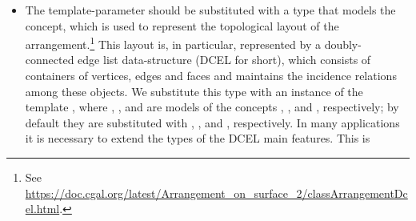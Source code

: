 \begin{itemize}
  The \cmake{} flag 
  specifies which geometry traits should be used for the generated
  bindings; see Table~\ref{tab:aos:gt}. Observe that instances of
  the class templates  and
   (see Section~\ref{ssec:modules:bso2})
  employ 2D arrangement types. Bindings for instances of
   and
   are enabled as part of the
  bindings for the \iiDRegularizedBooleanSetOperationsPackage{} package.
  When bindings for \iiDRegularizedBooleanSetOperationsPackage{} package
  are enabled bindings of the \iiDArrangementsPackage{} package must be
  explicitly enabled as well. The traits type that substitutes the
  traits parameter determines the type of curves that bound the polygons
  or generalized polygons, and the type must be explicitly indicated too
  (unless the segment type is selected, which is the default). The traits
  type must also model the  concept;
  see Figure~\ref{fig:atc:gps} for the relevant traits-concept cluster. The
  final traits type that is used for the bindings is automatically extended
  to respect this requirement. The details of this extension is given in
  Section~\ref{sec:extenders:arrTraits} of the appendix.
\item The  template-parameter should be substituted
  with a type that models the  concept,
  which is used to represent the topological layout of the
  arrangement.\footnote{See
    \url{https://doc.cgal.org/latest/Arrangement_on_surface_2/classArrangementDcel.html}.}
  This layout is, in particular, represented by a doubly-connected
  edge list data-structure (DCEL for short), which consists of
  containers of vertices, edges and faces and maintains the incidence
  relations among these objects. We substitute this type with an
  instance of the template , where , , and
   are models of the concepts\linebreak
  ,
  , and
  , respectively; by default they
  are substituted with
  ,
  , and
  , respectively. In many applications it
  is necessary to extend the types of the DCEL main features. This is

\end{itemize}
